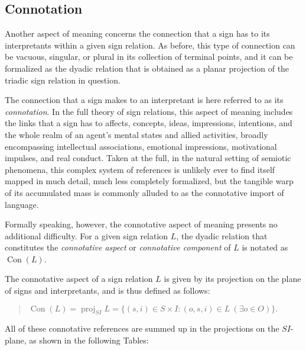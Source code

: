 \documentclass[12pt]{article}
\begin{document}
\subsection{Connotation}

Another aspect of meaning concerns the connection that a sign has to its interpretants within a given sign relation.  As before, this type of connection can be vacuous, singular, or plural in its collection of terminal points, and it can be formalized as the dyadic relation that is obtained as a planar projection of the triadic sign relation in question.

The connection that a sign makes to an interpretant is here referred to as its \textit{connotation}.  In the full theory of sign relations, this aspect of meaning includes the links that a sign has to affects, concepts, ideas, impressions, intentions, and the whole realm of an agent's mental states and allied activities, broadly encompassing intellectual associations, emotional impressions, motivational impulses, and real conduct.  Taken at the full, in the natural setting of semiotic phenomena, this complex system of references is unlikely ever to find itself mapped in much detail, much less completely formalized, but the tangible warp of its accumulated mass is commonly alluded to as the connotative import of language.

Formally speaking, however, the connotative aspect of meaning presents no additional difficulty.  For a given sign relation $L$, the dyadic relation that constitutes the \textit{connotative aspect} or \textit{connotative component} of $L$ is notated as $\operatorname{Con}(L)$.

The connotative aspect of a sign relation $L$ is given by its projection on the plane of signs and interpretants, and is thus defined as follows:

\begin{quote}
$\operatorname{Con}(L) = \operatorname{proj}_{SI}L = \{ (s, i) \in S \times I : (o, s, i) \in L\ (\exists o \in O) \}.$
\end{quote}

All of these connotative references are summed up in the projections on the $SI$-plane, as shown in the following Tables:
\end{document}
